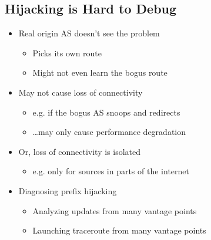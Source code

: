 \subsection{Hijacking is Hard to Debug}
\begin{itemize}[nosep]
    \item Real origin AS doesn't see the problem
          \begin{itemize}[nosep]
              \item Picks its own route
              \item Might not even learn the bogus route
          \end{itemize}
    \item May not cause loss of connectivity
          \begin{itemize}[nosep]
              \item e.g. if the bogus AS snoops and redirects
              \item \dots may only cause performance degradation
          \end{itemize}
    \item Or, loss of connectivity is isolated
          \begin{itemize}[nosep]
              \item e.g. only for sources in parts of the internet
          \end{itemize}
    \item Diagnosing prefix hijacking
          \begin{itemize}[nosep]
              \item Analyzing updates from many vantage points
              \item Launching traceroute from many vantage points
          \end{itemize}
\end{itemize}

